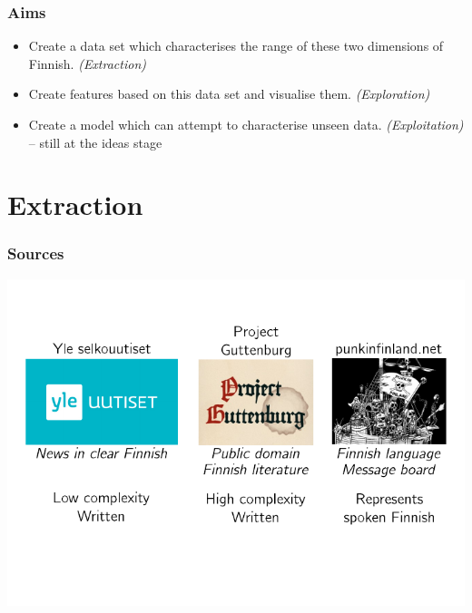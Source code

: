 \documentclass{beamer}
\newcommand{\cmark}{\ding{51}}%
\newcommand{\xmark}{\ding{55}}%
\begin{document}
\begin{frame}
\frametitle{Aims}

\begin{itemize}
  \item Create a data set which characterises the range of these two dimensions
        of Finnish. \textit{(Extraction)} \cmark{}\pause{}

  \item Create features based on this data set and visualise them.
        \textit{(Exploration)} \cmark{}\pause{}

  \item Create a model which can attempt to characterise unseen data.
        \textit{(Exploitation)} \xmark{} -- still at the ideas stage
\end{itemize}

\end{frame}

\section{Extraction}

\begin{frame}
  \frametitle{Sources}
  \includegraphics{sources.pdf}
\end{frame}
\end{document}
